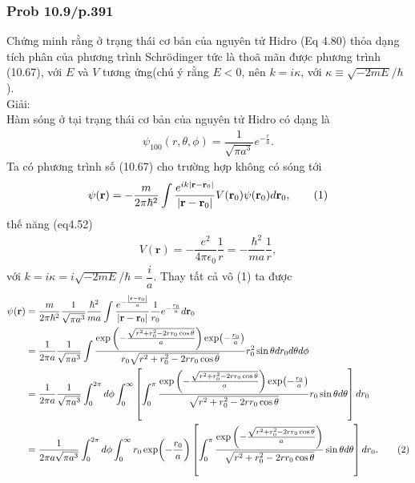 \documentclass{report}
\newcommand{\f}[2]{\dfrac{#1}{#2}}
\begin{document}
\subsubsection{Prob 10.9/p.391}
Chứng minh rằng ở trạng thái cơ bản của nguyên tử Hidro (Eq 4.80) thỏa dạng tích phân của phương trình Schr\"{o}dinger tức là thoã mãn được phương trình (10.67), với $E$ và $V$ tương ứng(chú ý rằng $E < 0$, nên $k = i\kappa$, với $\kappa \equiv \sqrt{-2mE}/\hbar$).\\
Giải:\\
Hàm sóng ở tại trạng thái cơ bản của nguyên tử Hidro có dạng là
\begin{align*}
	\psi_{100}(r,\theta,\phi) = \f{1}{\sqrt{\pi a^3}} e^{-\frac{r}{a}}.
\end{align*}
Ta có phương trình số (10.67) cho trường hợp không có sóng tới
\begin{align*}
	\psi(\mathbf{r}) = - \f{m}{2\pi\hbar^2} \int \f{e^{ik\abs{\mathbf{r} - \mathbf{r}_0}}}{\abs{\mathbf{r} - \mathbf{r}_0}} V(\mathbf{r}_0) \psi(\mathbf{r}_0) d\mathbf{r}_0, \tag{1}
\end{align*}
thế năng (eq4.52)
\begin{align*}
	V(\mathbf{r}) = - \f{e^2}{4\pi \epsilon_0}\f{1}{r} = - \f{\hbar^2}{ma}\f{1}{r},
\end{align*}
với $k = i\kappa = i \sqrt{-2mE}/\hbar = \f{i}{a}$.
Thay tất cả vô (1) ta được
\begin{align*}
	\psi(\mathbf{r})
	 & = \f{m}{2\pi\hbar^2} \f{1}{\sqrt{\pi a^3}} \f{\hbar^2}{ma} \int \f{e^{-\frac{\abs{\mathbf{r} - \mathbf{r}_0}}{a}}}{\abs{\mathbf{r} - \mathbf{r}_0}} \f{1}{r_0} e^{-\frac{r_0}{a}} d\mathbf{r}_0                                                                             \\
	 & = \f{1}{2\pi a} \f{1}{\sqrt{\pi a^3}} \int \f{\exp\left(-\frac{\sqrt{r^2 + r_0^2 - 2rr_0\cos\theta}}{a}\right)\exp(-\frac{r_0}{a})}{r_0\sqrt{r^2 + r_0^2 - 2rr_0\cos\theta}} r_0^2 \sin\theta d r_0 d\theta d\phi                                                           \\
	 & = \f{1}{2\pi a} \f{1}{\sqrt{\pi a^3}} \int_{0}^{2\pi} d\phi \int_{0}^{\infty} \left[\int_{0}^{\pi}  \f{\exp\left(-\frac{\sqrt{r^2 + r_0^2 - 2rr_0\cos\theta}}{a}\right)\exp(-\frac{r_0}{a})}{\sqrt{r^2 + r_0^2 - 2rr_0\cos\theta}} r_0 \sin\theta  d\theta \right] d r_0    \\
	 & = \f{1}{2\pi a \sqrt{\pi a^3}} \int_{0}^{2\pi} d\phi \int_{0}^{\infty} r_0 \exp(-\frac{r_0}{a}) \left[\int_{0}^{\pi}  \f{\exp\left(-\frac{\sqrt{r^2 + r_0^2 - 2rr_0\cos\theta}}{a}\right)}{\sqrt{r^2 + r_0^2 - 2rr_0\cos\theta}} \sin\theta  d\theta \right] d r_0. \tag{2}
\end{align*}
\end{document}
